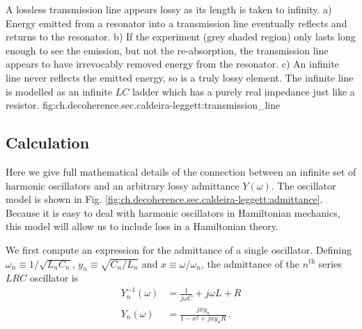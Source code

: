 {A lossless transmission line appears lossy as its length is taken to infinity.
a) Energy emitted from a resonator into a transmission line eventually reflects and returns to the resonator.
b) If the experiment (grey shaded region) only lasts long enough to see the emission, but not the re-absorption, the transmission line appears to have irrevocably removed energy from the resonator.
c) An infinite line never reflects the emitted energy, so is a truly lossy element.
The infinite line is modelled as an infinite $LC$ ladder which has a purely real impedance just like a resistor.
}
{fig:ch.decoherence.sec.caldeira-leggett:transmission_line}


\subsection{Calculation}

Here we give full mathematical details of the connection between an infinite set of harmonic oscillators and an arbitrary lossy admittance $Y(\omega)$.
The oscillator model is shown in Fig. \ref{fig:ch.decoherence.sec.caldeira-leggett:admittance}.
Because it is easy to deal with harmonic oscillators in Hamiltonian mechanics, this model will allow us to include loss in a Hamiltonian theory.


We first compute an expression for the admittance of a single oscillator.
Defining $\omega_n \equiv 1/\sqrt{L_n C_n}$, $y_n \equiv \sqrt{C_n / L_n}$ and $x \equiv \omega / \omega_n$, the admittance of the $n^{\text{th}}$ series $LRC$ oscillator is
\begin{align}
Y_n^{-1}(\omega) &= \frac{1}{j \omega C} + j \omega L + R \\
Y_n(\omega) &= \frac{j x y_n}{1 - x^2 + j x y_n R} \, .
\end{align}

